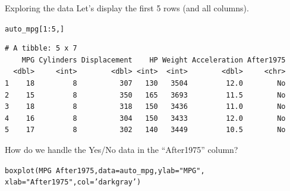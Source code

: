 \documentclass{beamer}\usepackage[]{graphicx}\usepackage[]{color}
\makeatletter
\newcommand{\hlnum}[1]{\textcolor[rgb]{0.824,0.412,0.118}{#1}}%
\newcommand{\hlstr}[1]{\textcolor[rgb]{1,0.894,0.71}{#1}}%
\newcommand{\hlopt}[1]{\textcolor[rgb]{1,0.894,0.769}{#1}}%
\newcommand{\hlstd}[1]{\textcolor[rgb]{1,0.894,0.769}{#1}}%
\newcommand{\hlkwc}[1]{\textcolor[rgb]{0.78,0.941,0.545}{#1}}%
\newcommand{\hlkwd}[1]{\textcolor[rgb]{1,0.78,0.769}{#1}}%
\newenvironment{kframe}{%
 \def\at@end@of@kframe{}%
 \ifinner\ifhmode%
  \def\at@end@of@kframe{\end{minipage}}%
  \begin{minipage}{\columnwidth}%
 \fi\fi%
 \def\FrameCommand##1{\hskip\@totalleftmargin \hskip-\fboxsep
 \colorbox{shadecolor}{##1}\hskip-\fboxsep
     \hskip-\linewidth \hskip-\@totalleftmargin \hskip\columnwidth}%
 \MakeFramed {\advance\hsize-\width
   \@totalleftmargin\z@ \linewidth\hsize
   \@setminipage}}%
 {\par\unskip\endMakeFramed%
 \at@end@of@kframe}
\newenvironment{knitrout}{}{} %
\makeatother
\begin{document}
\begin{darkframes}
\begin{frame}[fragile]{Exploring the data}
      \fontsize{9}{9}\selectfont
      Let's display the first 5 rows (and all columns).
\begin{knitrout}
\begin{kframe}
\begin{alltt}
\hlstd{auto_mpg[}\hlnum{1}\hlopt{:}\hlnum{5}\hlstd{,]}
\end{alltt}
\begin{verbatim}
# A tibble: 5 x 7
    MPG Cylinders Displacement    HP Weight Acceleration After1975
  <dbl>     <int>        <dbl> <int>  <int>        <dbl>     <chr>
1    18         8          307   130   3504         12.0        No
2    15         8          350   165   3693         11.5        No
3    18         8          318   150   3436         11.0        No
4    16         8          304   150   3433         12.0        No
5    17         8          302   140   3449         10.5        No
\end{verbatim}
\end{kframe}
\end{knitrout}
      \pause
      How do we handle the Yes/No data in the ``After1975'' column?
\end{frame}




\begin{frame}[fragile]%
\begin{knitrout}
\begin{kframe}
\begin{alltt}
\hlkwd{boxplot}\hlstd{(MPG} \hlopt{~} \hlstd{After1975,} \hlkwc{data}\hlstd{=auto_mpg,} \hlkwc{ylab}\hlstd{=}\hlstr{"MPG"}\hlstd{,}
              \hlkwc{xlab}\hlstd{=}\hlstr{"After 1975"}\hlstd{,} \hlkwc{col}\hlstd{=}\hlstr{'darkgray'}\hlstd{)}
\end{alltt}
\end{kframe}


\end{knitrout}

\end{frame}




\end{darkframes}
\end{document}
